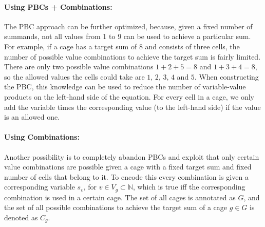 \paragraph{Using PBCs + Combinations:}
The PBC approach can be further optimized, because, given a fixed number of summands, not all values from 1 to 9 can be used to achieve a particular sum. For example, if a cage has a target sum of 8 and consists of three cells, the number of possible value combinations to achieve the target sum is fairly limited. There are only two possible value combinations $1+2+5=8$ and $1+3+4=8$, so the allowed values the cells could take are $1$, $2$, $3$, $4$ and $5$. When constructing the PBC, this knowledge can be used to reduce the number of variable-value products on the left-hand side of the equation. For every cell in a cage, we only add the variable times the corresponding value (to the left-hand side) if the value is an allowed one.

\paragraph{Using Combinations:}
Another possibility is to completely abandon PBCs and exploit that only certain value combinations are possible given a cage with a fixed target sum and fixed number of cells that belong to it. To encode this every combination is given a corresponding variable $s_{v}$, for $v \in V_g  \subset\mathbb{N}$, which is true iff the corresponding combination is used in a certain cage. The set of all cages is annotated as $G$, and the set of all possible combinations to achieve the target sum of a cage $g \in G$ is denoted as $C_g$.

